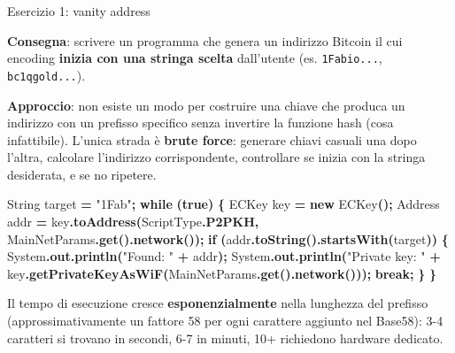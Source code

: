 \documentclass[
  italian,
  openany]{book}
\newenvironment{Shaded}{\begin{snugshade}}{\end{snugshade}}
\newcommand{\BuiltInTok}[1]{#1}
\newcommand{\ControlFlowTok}[1]{\textcolor[rgb]{0.13,0.29,0.53}{\textbf{#1}}}
\newcommand{\FunctionTok}[1]{\textcolor[rgb]{0.13,0.29,0.53}{\textbf{#1}}}
\newcommand{\KeywordTok}[1]{\textcolor[rgb]{0.13,0.29,0.53}{\textbf{#1}}}
\newcommand{\NormalTok}[1]{#1}
\newcommand{\OperatorTok}[1]{\textcolor[rgb]{0.81,0.36,0.00}{\textbf{#1}}}
\newcommand{\StringTok}[1]{\textcolor[rgb]{0.31,0.60,0.02}{#1}}
\begin{document}
\begin{callouttip}{Esercizio 1: vanity address}

\textbf{Consegna}: scrivere un programma che genera un indirizzo Bitcoin
il cui encoding \textbf{inizia con una stringa scelta} dall'utente (es.
\texttt{1Fabio...}, \texttt{bc1qgold...}).

\textbf{Approccio}: non esiste un modo per costruire una chiave che
produca un indirizzo con un prefisso specifico senza invertire la
funzione hash (cosa infattibile). L'unica strada è \textbf{brute force}:
generare chiavi casuali una dopo l'altra, calcolare l'indirizzo
corrispondente, controllare se inizia con la stringa desiderata, e se no
ripetere.

\begin{Shaded}
\begin{Highlighting}[]
\BuiltInTok{String}\NormalTok{ target }\OperatorTok{=} \StringTok{"1Fab"}\OperatorTok{;}
\ControlFlowTok{while} \OperatorTok{(}\KeywordTok{true}\OperatorTok{)} \OperatorTok{\{}
    \BuiltInTok{ECKey}\NormalTok{ key }\OperatorTok{=} \KeywordTok{new} \BuiltInTok{ECKey}\OperatorTok{();}
\NormalTok{    Address addr }\OperatorTok{=}\NormalTok{ key}\OperatorTok{.}\FunctionTok{toAddress}\OperatorTok{(}\NormalTok{ScriptType}\OperatorTok{.}\FunctionTok{P2PKH}\OperatorTok{,}\NormalTok{ MainNetParams}\OperatorTok{.}\FunctionTok{get}\OperatorTok{().}\FunctionTok{network}\OperatorTok{());}
    \ControlFlowTok{if} \OperatorTok{(}\NormalTok{addr}\OperatorTok{.}\FunctionTok{toString}\OperatorTok{().}\FunctionTok{startsWith}\OperatorTok{(}\NormalTok{target}\OperatorTok{))} \OperatorTok{\{}
        \BuiltInTok{System}\OperatorTok{.}\FunctionTok{out}\OperatorTok{.}\FunctionTok{println}\OperatorTok{(}\StringTok{"Found: "} \OperatorTok{+}\NormalTok{ addr}\OperatorTok{);}
        \BuiltInTok{System}\OperatorTok{.}\FunctionTok{out}\OperatorTok{.}\FunctionTok{println}\OperatorTok{(}\StringTok{"Private key: "} \OperatorTok{+}\NormalTok{ key}\OperatorTok{.}\FunctionTok{getPrivateKeyAsWiF}\OperatorTok{(}\NormalTok{MainNetParams}\OperatorTok{.}\FunctionTok{get}\OperatorTok{().}\FunctionTok{network}\OperatorTok{()));}
        \ControlFlowTok{break}\OperatorTok{;}
    \OperatorTok{\}}
\OperatorTok{\}}
\end{Highlighting}
\end{Shaded}

Il tempo di esecuzione cresce \textbf{esponenzialmente} nella lunghezza
del prefisso (approssimativamente un fattore 58 per ogni carattere
aggiunto nel Base58): 3-4 caratteri si trovano in secondi, 6-7 in
minuti, 10+ richiedono hardware dedicato.

\end{callouttip}
\end{document}
